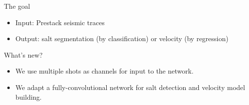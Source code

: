 \documentclass[aspectratio=169]{beamer}
\begin{document}
\begin{frame}
\begin{block}{The goal}
\begin{itemize}
\item{Input: Prestack seismic traces}
\item{Output: salt segmentation (by classification) or velocity (by regression)}
\end{itemize}
\end{block}
\begin{block}{What's new?}
\begin{itemize}
\item{We use multiple shots as channels for input to the network.}
\item{We adapt a fully-convolutional network for salt detection and velocity model building.}
\end{itemize}
\end{block}
\end{frame}
\end{document}
